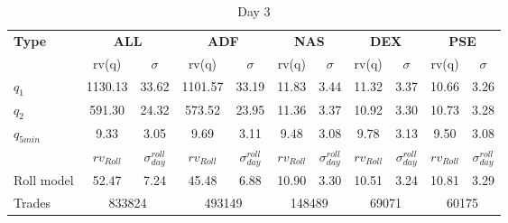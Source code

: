 \documentclass{article}
\begin{document}
\begin{table}[h!]
\centering
\begin{adjustbox}{width=\textwidth}
\begin{tabular}{lcccccccccc}
\toprule
\textbf{Type} & \multicolumn{2}{c}{\textbf{ALL}} & \multicolumn{2}{c}{\textbf{ADF}} & \multicolumn{2}{c}{\textbf{NAS}} & \multicolumn{2}{c}{\textbf{DEX}} & \multicolumn{2}{c}{\textbf{PSE}} \\
\cmidrule(lr){2-3} \cmidrule(lr){4-5} \cmidrule(lr){6-7} \cmidrule(lr){8-9} \cmidrule(lr){10-11}
 & rv(q) & $\sigma$ & rv(q) & $\sigma$ & rv(q) & $\sigma$ & rv(q) & $\sigma$ & rv(q) & $\sigma$ \\
\midrule
$q_1$        & 1130.13 & 33.62 & 1101.57 & 33.19 & 11.83 & 3.44 & 11.32 & 3.37 & 10.66 & 3.26 \\
$q_2$       & 591.30  & 24.32 & 573.52  & 23.95 & 11.36 & 3.37 & 10.92 & 3.30 & 10.73 & 3.28 \\
$q_{5min}$   & 9.33    & 3.05  & 9.69    & 3.11  & 9.48  & 3.08 & 9.78  & 3.13 & 9.50  & 3.08 \\
\midrule
& {$rv_{Roll}$} & {$\sigma_{day}^{roll}$} & {$rv_{Roll}$} & {$\sigma_{day}^{roll}$} & {$rv_{Roll}$} & {$\sigma_{day}^{roll}$}& {$rv_{Roll}$} & {$\sigma_{day}^{roll}$}& {$rv_{Roll}$} & {$\sigma_{day}^{roll}$} \\
Roll model & 52.47  & 7.24  & 45.48  & 6.88  & 10.90 & 3.30 & 10.51 & 3.24 & 10.81 & 3.29 \\
Trades     & \multicolumn{2}{c}{833824} & \multicolumn{2}{c}{493149} & \multicolumn{2}{c}{148489} & \multicolumn{2}{c}{69071} & \multicolumn{2}{c}{60175} \\
\bottomrule
\end{tabular}
\end{adjustbox}
\caption{Day 3}
\label{tab:final_summary_table}
\end{table}
\end{document}
